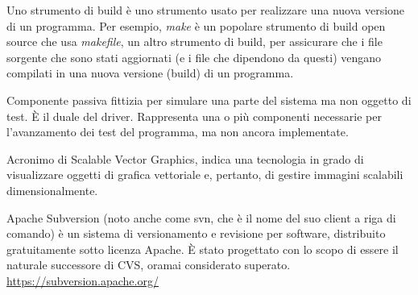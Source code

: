 Uno strumento di build è uno strumento usato per realizzare una nuova versione di un programma. Per esempio, \textit{make} è un popolare strumento di build open source che usa \textit{makefile}, un altro strumento di build, per assicurare che i file sorgente che sono stati aggiornati (e i file che dipendono da questi) vengano compilati in una nuova versione (build) di un programma.

Componente passiva fittizia per simulare una parte del sistema ma non oggetto di test. \`{E} il duale del driver. Rappresenta una o più componenti necessarie per l’avanzamento dei test del programma, ma non ancora implementate.

Acronimo di Scalable Vector Graphics, indica una tecnologia in grado di visualizzare oggetti di grafica vettoriale e, pertanto, di gestire immagini scalabili dimensionalmente.

Apache Subversion (noto anche come svn, che è il nome del suo client a riga di comando) è un sistema di versionamento e revisione per software, distribuito gratuitamente sotto licenza Apache. \`{E} stato progettato con lo scopo di essere il naturale successore di CVS, oramai considerato superato.\\
\url{https://subversion.apache.org/}
\clearpage
